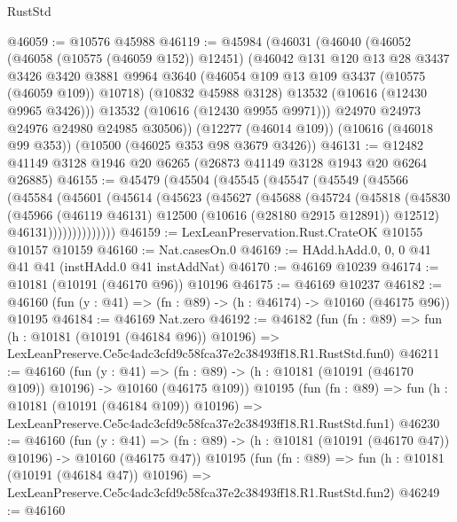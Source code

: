 \begin{lexlean}{RustStd}
\begin{coremodule}
@46059 := @10576 @45988
@46119 := @45984
    (@46031
      (@46040
        (@46052
          (@46058 (@10575 (@46059 @152)) @12451)
          (@46042
            @131
            @120
            @13
            @28
            @3437
            @3426
            @3420
            @3881
            @9964
            @3640
            (@46054 @109 @13 @109 @3437 (@10575 (@46059 @109)) @10718)
            (@10832 @45988 @3128)
            @13532
            (@10616 (@12430 @9965 @3426)))
          @13532
          (@10616 (@12430 @9955 @9971)))
        @24970
        @24973
        @24976
        @24980
        @24985
        @30506))
    (@12277 (@46014 @109))
    (@10616 (@46018 @99 @353))
    (@10500 (@46025 @353 @98 @3679 @3426))
@46131 := @12482 @41149 @3128 @1946 @20 @6265 (@26873 @41149 @3128 @1943 @20 @6264 @26885)
@46155 := @45479
    (@45504
      (@45545
        (@45547
          (@45549
            (@45566
              (@45584
                (@45601
                  (@45614
                    (@45623
                      (@45627
                        (@45688
                          (@45724
                            (@45818
                              (@45830
                                (@45966
                                  (@46119 @46131)
                                  @12500
                                  (@10616 (@28180 @2915 @12891))
                                  @12512)
                                @46131))))))))))))))
@46159 := LexLeanPreservation.Rust.CrateOK @10155 @10157 @10159
@46160 := Nat.casesOn.{0}
@46169 := HAdd.hAdd.{0, 0, 0} @41 @41 @41 (instHAdd.{0} @41 instAddNat)
@46170 := @46169 @10239
@46174 := @10181 (@10191 (@46170 @96)) @10196
@46175 := @46169 @10237
@46182 := @46160 (fun (y : @41) => (fn : @89) -> (h : @46174) -> @10160 (@46175 @96)) @10195
@46184 := @46169 Nat.zero
@46192 := @46182
    (fun (fn : @89) =>
    fun (h : @10181 (@10191 (@46184 @96)) @10196) =>
    LexLeanPreserve.Ce5c4adc3cfd9c58fca37e2c38493ff18.R1.RustStd.fun0)
@46211 := @46160
    (fun (y : @41) =>
    (fn : @89) -> (h : @10181 (@10191 (@46170 @109)) @10196) -> @10160 (@46175 @109))
    @10195
    (fun (fn : @89) =>
    fun (h : @10181 (@10191 (@46184 @109)) @10196) =>
    LexLeanPreserve.Ce5c4adc3cfd9c58fca37e2c38493ff18.R1.RustStd.fun1)
@46230 := @46160
    (fun (y : @41) =>
    (fn : @89) -> (h : @10181 (@10191 (@46170 @47)) @10196) -> @10160 (@46175 @47))
    @10195
    (fun (fn : @89) =>
    fun (h : @10181 (@10191 (@46184 @47)) @10196) =>
    LexLeanPreserve.Ce5c4adc3cfd9c58fca37e2c38493ff18.R1.RustStd.fun2)
@46249 := @46160

\end{coremodule}
\end{lexlean}
